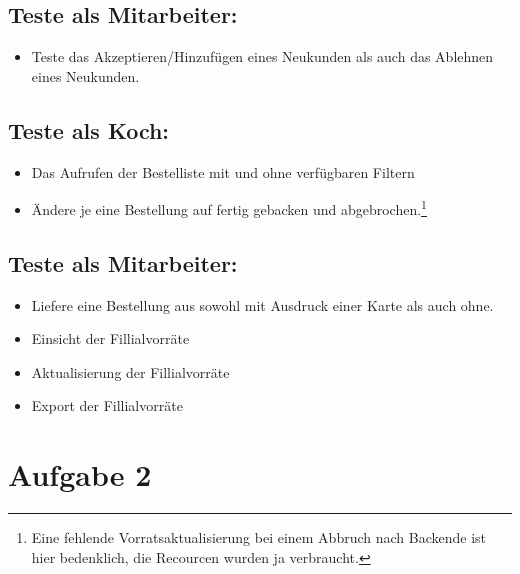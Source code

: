 \documentclass[a4paper]{report}
\begin{document}
\subsection*{Teste als Mitarbeiter:}
\begin{itemize}
 \item Teste das Akzeptieren/Hinzufügen eines Neukunden als auch das Ablehnen eines Neukunden. 
\end{itemize}

\subsection*{Teste als Koch:}
\begin{itemize}
 \item Das Aufrufen der Bestelliste mit und ohne verfügbaren Filtern
 \item Ändere je eine Bestellung auf fertig gebacken und abgebrochen.\footnote{Eine fehlende Vorratsaktualisierung bei einem Abbruch nach Backende ist hier bedenklich, die Recourcen wurden ja verbraucht.}
\end{itemize}


\subsection*{Teste als Mitarbeiter:}
\begin{itemize}
 \item Liefere eine Bestellung aus sowohl mit Ausdruck einer Karte als auch ohne.
 \item Einsicht der Fillialvorräte
 \item Aktualisierung der Fillialvorräte
 \item Export der Fillialvorräte
\end{itemize}




\newpage
\section*{Aufgabe 2}






\end{document}
